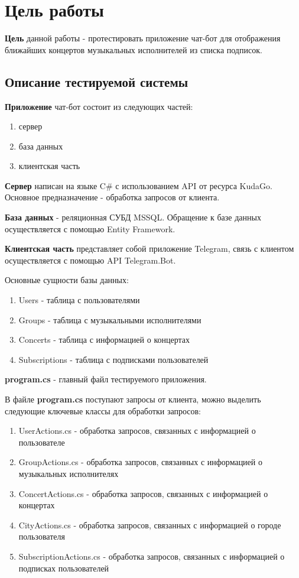 \chapter{Цель работы}

\textbf{Цель} данной работы - протестировать приложение чат-бот для отображения ближайших концертов музыкальных исполнителей из списка подписок.

\section{Описание тестируемой системы}

\textbf{Приложение} чат-бот состоит из следующих частей:
\begin{enumerate}
	\item сервер
	\item база данных
	\item клиентская часть
\end{enumerate}

\textbf{Сервер} написан на языке C\# с использованием API от ресурса KudaGo. Основное предназначение - обработка запросов от клиента.

\textbf{База данных} - реляционная СУБД MSSQL. Обращение к базе данных осуществляется с помощью Entity Framework. 

\textbf{Клиентская часть} представляет собой приложение Telegram, связь с клиентом осуществляется с помощью API Telegram.Bot.

Основные сущности базы данных:
\begin{enumerate}
	\item Users - таблица с пользователями
	\item Groups - таблица с музыкальными исполнителями
	\item Concerts - таблица с информацией о концертах
	\item Subscriptions - таблица с подписками пользователей
\end{enumerate}

\textbf{program.cs} - главный файл тестируемого приложения.

В файле \textbf{program.cs} поступают запросы от клиента, можно выделить следующие ключевые классы для обработки запросов:

\begin{enumerate}
	\item UserActions.cs - обработка запросов, связанных с информацией о пользователе
	\item GroupActions.cs - обработка запросов, связанных с информацией о музыкальных исполнителях
	\item ConcertActions.cs - обработка запросов, связанных с информацией о концертах
	\item CityActions.cs - обработка запросов, связанных с информацией о городе пользователя
	\item SubscriptionActions.cs - обработка запросов, связанных с информацией о подписках пользователей
\end{enumerate}

